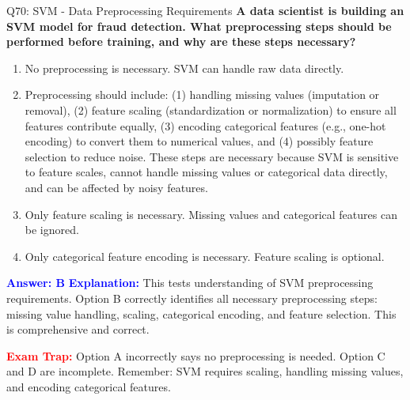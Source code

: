 \documentclass[8pt]{beamer}
\begin{document}
	\begin{frame}{Q70: SVM - Data Preprocessing Requirements}
		\fontsize{6.5}{7.5}\selectfont
		\textbf{A data scientist is building an SVM model for fraud detection. What preprocessing steps should be performed before training, and why are these steps necessary?}
		
		\begin{enumerate}
			\item No preprocessing is necessary. SVM can handle raw data directly.
			\item Preprocessing should include: (1) handling missing values (imputation or removal), (2) feature scaling (standardization or normalization) to ensure all features contribute equally, (3) encoding categorical features (e.g., one-hot encoding) to convert them to numerical values, and (4) possibly feature selection to reduce noise. These steps are necessary because SVM is sensitive to feature scales, cannot handle missing values or categorical data directly, and can be affected by noisy features.
			\item Only feature scaling is necessary. Missing values and categorical features can be ignored.
			\item Only categorical feature encoding is necessary. Feature scaling is optional.
		\end{enumerate}
		
		\vspace{0.1cm}
		\textcolor{blue}{\textbf{Answer: B}}
		\vspace{0.1cm}
		\textcolor{blue}{\textbf{Explanation:}} This tests understanding of SVM preprocessing requirements. Option B correctly identifies all necessary preprocessing steps: missing value handling, scaling, categorical encoding, and feature selection. This is comprehensive and correct.
		
		\textcolor{red}{\textbf{Exam Trap:}} Option A incorrectly says no preprocessing is needed. Option C and D are incomplete. Remember: SVM requires scaling, handling missing values, and encoding categorical features.
	\end{frame}
	
\end{document}
